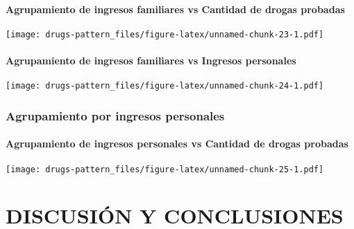 \documentclass[]{article}
\let\oldparagraph\paragraph
\renewcommand{\paragraph}[1]{\oldparagraph{#1}\mbox{}}
\begin{document}
\paragraph{Agrupamiento de ingresos familiares vs Cantidad de drogas
probadas}\label{agrupamiento-de-ingresos-familiares-vs-cantidad-de-drogas-probadas}

\texttt{[image: drugs-pattern\_files/figure-latex/unnamed-chunk-23-1.pdf]}

\paragraph{Agrupamiento de ingresos familiares vs Ingresos
personales}\label{agrupamiento-de-ingresos-familiares-vs-ingresos-personales}

\texttt{[image: drugs-pattern\_files/figure-latex/unnamed-chunk-24-1.pdf]}

\subsubsection{Agrupamiento por ingresos
personales}\label{agrupamiento-por-ingresos-personales}

\paragraph{Agrupamiento de ingresos personales vs Cantidad de drogas
probadas}\label{agrupamiento-de-ingresos-personales-vs-cantidad-de-drogas-probadas}

\texttt{[image: drugs-pattern\_files/figure-latex/unnamed-chunk-25-1.pdf]}

\section{DISCUSIÓN Y CONCLUSIONES}\label{discusion-y-conclusiones}
\end{document}
